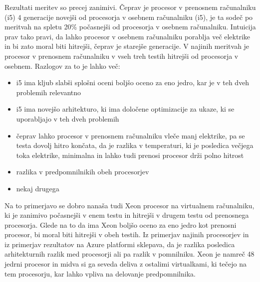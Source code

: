 Rezultati meritev so precej zanimivi. Čeprav je procesor v prenosnem računalniku (i5) 4 generacije novejši od procesorja v osebnem računalniku (i5), je ta sodeč po meritvah na spletu 20\% počasnejši od procesorja v osebnem računalniku. Intuicija prav tako pravi, da lahko procesor v osebnem računalniku porablja več elektrike in bi zato moral biti hitrejši, čeprav je starejše generacije. V najinih meritvah je procesor v prenosnem računalniku v vseh treh testih hitrejši od procesorja v osebnem. Razlogov za to je lahko več:

\begin{itemize}
	\item i5 ima kljub slabši splošni oceni boljšo oceno za eno jedro, kar je v teh dveh problemih relevantno
	\item i5 ima novejšo arhitekturo, ki ima določene optimizacije za ukaze, ki se uporabljajo v teh dveh problemih
	\item čeprav lahko procesor v prenosnem računalniku vleče manj elektrike, pa se testa dovolj hitro končata, da je razlika v temperaturi, ki je posledica večjega toka elektrike, minimalna in lahko tudi prenosi procesor drži polno hitrost
	\item razlika v predpomnilnikih obeh procesorjev
	\item nekaj drugega
\end{itemize}

Na to primerjavo se dobro nanaša tudi Xeon procesor na virtualnem računalniku, ki je zanimivo počasnejši v enem testu in hitrejši v drugem testu od prenosnega procesorja. Glede na to da ima Xeon boljšo oceno za eno jedro kot prenosni procesor, bi moral biti hitrejši v obeh testih. Iz primerjav najinih procesorjev in iz primerjav rezultatov na Azure platformi sklepava, da je razlika posledica arhitekturnih razlik med procesorji ali pa razlik v pomnilniku. Xeon je namreč 48 jedrni procesor in midva si ga seveda deliva z ostalimi virtualkami, ki tečejo na tem procesorju, kar lahko vpliva na delovanje predpomnilnika.



